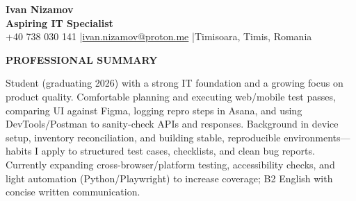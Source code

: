 \documentclass[11pt,a4paper]{article}
\newcommand{\sectionheader}[1]{\vspace{6pt}\textbf{\large #1}\par\vspace{4pt}}
\newcommand{\sep}{\;|\;}
\begin{document}
\pagestyle{empty}

\begin{minipage}[t]{0.75\textwidth}
\vspace{0pt}
\begin{center}
{\LARGE \textbf{Ivan Nizamov}}\\[2pt]
\textbf{Aspiring IT Specialist}\\[6pt]
+40 738 030 141 \sep \href{mailto:ivan.nizamov@proton.me}{ivan.nizamov@proton.me} \sep Timisoara, Timis, Romania
\end{center}
\end{minipage}
\hfill
\begin{minipage}[t]{0.22\textwidth}
\vspace{0pt}
\begin{center}
\end{center}
\end{minipage}

\sectionheader{PROFESSIONAL SUMMARY}
Student (graduating 2026) with a strong IT foundation and a growing focus on product quality. Comfortable planning and executing web/mobile test passes, comparing UI against Figma, logging repro steps in Asana, and using DevTools/Postman to sanity-check APIs and responses. Background in device setup, inventory reconciliation, and building stable, reproducible environments—habits I apply to structured test cases, checklists, and clean bug reports. Currently expanding cross-browser/platform testing, accessibility checks, and light automation (Python/Playwright) to increase coverage; B2 English with concise written communication.
\end{document}
